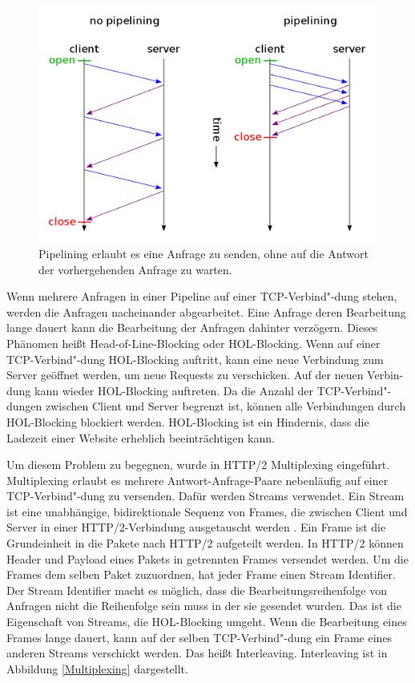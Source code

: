 \documentclass{llncs}
\begin{document}
\begin{figure}[!ht]
\includegraphics[width=\columnwidth]{1200px-HTTP_pipelining2}
\caption{Pipelining erlaubt es eine Anfrage zu senden, ohne auf die Antwort der vorhergehenden Anfrage zu warten.\cite{Pipelining}}
\end{figure}

Wenn mehrere Anfragen in einer Pipeline auf einer TCP-Verbind"-dung stehen, werden die Anfragen nacheinander abgearbeitet. Eine Anfrage deren Bearbeitung lange dauert kann die Bearbeitung der Anfragen dahinter verzögern. Dieses Phänomen heißt Head-of-Line-Blocking oder HOL-Blocking. Wenn auf einer TCP-Verbind"-dung HOL-Blocking auftritt, kann eine neue Verbindung zum Server geöffnet werden, um neue Requests zu verschicken. Auf der neuen Verbin-dung kann wieder HOL-Blocking auftreten. Da die Anzahl der TCP-Verbind"-dungen zwischen Client und Server begrenzt ist, können alle Verbindungen durch HOL-Blocking blockiert werden. HOL-Blocking ist ein Hindernis, dass die Ladezeit einer Website erheblich beeinträchtigen kann.

Um diesem Problem zu begegnen, wurde in HTTP/2 Multiplexing eingeführt. Multiplexing erlaubt es mehrere Antwort-Anfrage-Paare nebenläufig auf einer TCP-Verbind"-dung zu versenden. Dafür werden Streams verwendet.
Ein Stream ist eine unabhängige, bidirektionale Sequenz von Frames, die zwischen Client und Server in einer HTTP/2-Verbindung ausgetauscht werden \cite{Belshe2015}.
Ein Frame ist die Grundeinheit in die Pakete nach HTTP/2 aufgeteilt werden. In HTTP/2 können Header und Payload eines Pakets in getrennten Frames versendet werden. Um die Frames dem selben Paket zuzuordnen, hat jeder Frame einen Stream Identifier. Der Stream Identifier macht es möglich, dass die Bearbeitungsreihenfolge von Anfragen nicht die Reihenfolge sein muss in der sie gesendet wurden. Das ist die Eigenschaft von Streams, die HOL-Blocking umgeht. Wenn die Bearbeitung eines Frames lange dauert, kann auf der selben TCP-Verbind"-dung ein Frame eines anderen Streams verschickt werden. Das heißt Interleaving. Interleaving ist in Abbildung \ref{Multiplexing} dargestellt.
\end{document}
